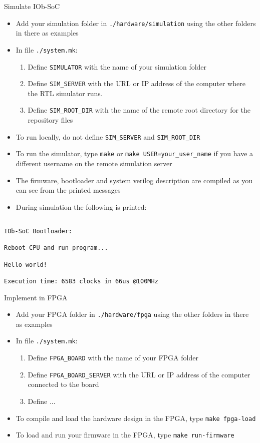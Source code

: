 \documentclass [xcolor=svgnames, t] {beamer}
\begin{document}
\begin{frame}[fragile]{Simulate IOb-SoC}
\begin{itemize}
  \item Add your simulation folder in {\tt ./hardware/simulation} using the other folders in there as examples
  \item In  file {\tt ./system.mk}:
  \begin{enumerate}
    \item Define {\tt SIMULATOR} with the name of your simulation folder
    \item Define {\tt SIM\_SERVER} with the URL or IP address of the computer where the RTL simulator runs.
    \item Define {\tt SIM\_ROOT\_DIR} with the name of the remote root directory for the repository files
  \end{enumerate}
  \item To run locally, do not define {\tt SIM\_SERVER} and {\tt SIM\_ROOT\_DIR}
  \item To run the simulator, type {\tt make} or {\tt make USER=your\_user\_name} if you have a different username on the remote simulation server
  \item The firmware, bootloader and system verilog description are compiled as you can see from the printed messages
  \item During simulation the following is printed:
\end{itemize}
\begin{tiny}
\begin{lstlisting}

IOb-SoC Bootloader:

Reboot CPU and run program...

Hello world!

Execution time: 6583 clocks in 66us @100MHz

\end{lstlisting}
\end{tiny}
\end{frame}


\begin{frame}{Implement in FPGA}
\begin{itemize}
  \item Add your FPGA folder in {\tt ./hardware/fpga} using the other folders in there as examples
  \item In file {\tt ./system.mk}:
  \begin{enumerate}
    \item Define {\tt FPGA\_BOARD} with the name of your FPGA folder
    \item Define {\tt FPGA\_BOARD\_SERVER} with the URL or IP address of the computer connected to the board
    \item Define ...
  \end{enumerate}
  \item To compile and load the hardware design in the FPGA, type {\tt make fpga-load}
  \item To load and run your firmware in the FPGA, type {\tt make run-firmware}
\end{itemize}
\end{frame}
\end{document}
